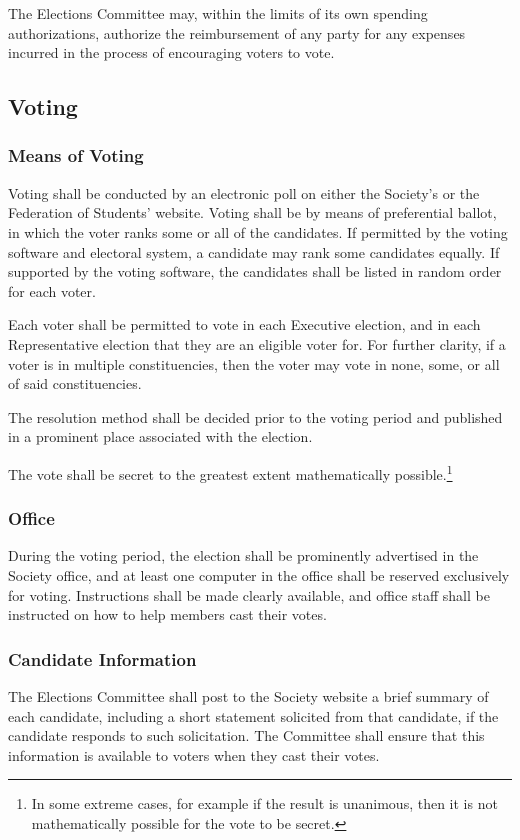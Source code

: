 The Elections Committee may, within the limits of its own spending authorizations, authorize the reimbursement of any party for any expenses incurred in the process of encouraging voters to vote.

\subsection{Voting}
\subsubsection{Means of Voting}
Voting shall be conducted by an electronic poll on either the Society's or the Federation of Students' website.
Voting shall be by means of preferential ballot, in which the voter ranks some or all of the candidates.
If permitted by the voting software and electoral system, a candidate may rank some candidates equally.
If supported by the voting software, the candidates shall be listed in random order for each voter.

Each voter shall be permitted to vote in each Executive election, and in each Representative election that they are an eligible voter for.
For further clarity, if a voter is in multiple constituencies, then the voter may vote in none, some, or all of said constituencies.

The resolution method shall be decided prior to the voting period and published in a prominent place associated with the election.

The vote shall be secret to the greatest extent mathematically possible.\footnote{In some extreme cases, for example if the result is unanimous, then it is not mathematically possible for the vote to be secret.}

\subsubsection{Office}
During the voting period, the election shall be prominently advertised in the Society office, and at least one computer in the office shall be reserved exclusively for voting.
Instructions shall be made clearly available, and office staff shall be instructed on how to help members cast their votes.

\subsubsection{Candidate Information}
The Elections Committee shall post to the Society website a brief summary of each candidate, including a short statement solicited from that candidate, if the candidate responds to such solicitation.
The Committee shall ensure that this information is available to voters when they cast their votes.

